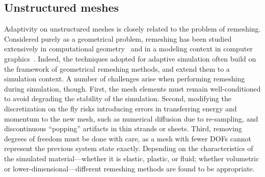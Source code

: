 \subsection{Unstructured meshes}
\label{sec:meshes}
Adaptivity on unstructured meshes is closely related to the problem of remeshing.
Considered purely as a geometrical problem, remeshing has been studied extensively in computational geometry~\cite{Cheng2012} and in a modeling context in computer graphics~\cite{Alliez2008}.
Indeed, the techniques adopted for adaptive simulation often build on the framework of geometrical remeshing methods, and extend them to a simulation context.
A number of challenges arise when performing remeshing during simulation, though.
First, the mesh elements must remain well-conditioned to avoid degrading the stability of the simulation.
Second, modifying the discretization on the fly risks introducing errors in transferring energy and momentum to the new mesh, such as numerical diffusion due to re-sampling, and discontinuous ``popping'' artifacts in thin strands or sheets.
Third, removing degrees of freedom must be done with care, as a mesh with fewer DOFs cannot represent the previous system state exactly.
Depending on the characteristics of the simulated material---whether it is elastic, plastic, or fluid; whether volumetric or lower-dimensional---different remeshing methods are found to be appropriate.
